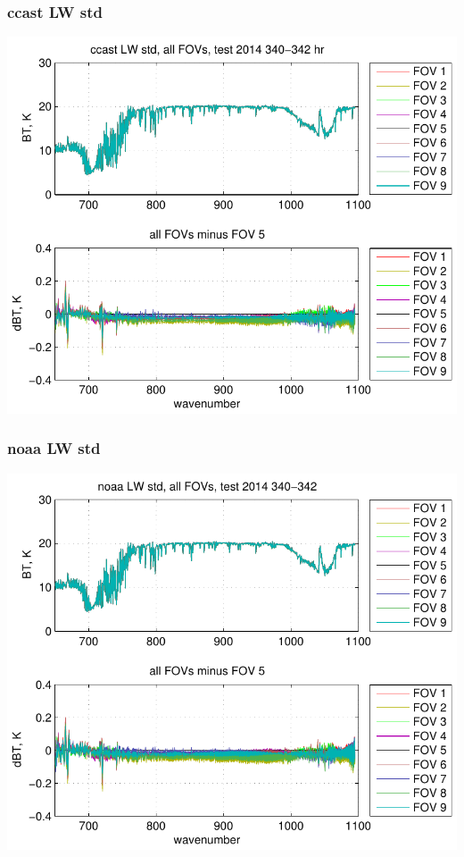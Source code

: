 \begin{frame}
\frametitle{ccast LW std}

\begin{center}
  \includegraphics[scale=0.7]{figures/ccast_LW_std_2014_340-342_hr.pdf}
\end{center}

\end{frame}
\begin{frame}
\frametitle{noaa LW std}

\begin{center}
  \includegraphics[scale=0.7]{figures/noaa_LW_std_2014_340-342.pdf}
\end{center}

\end{frame}
